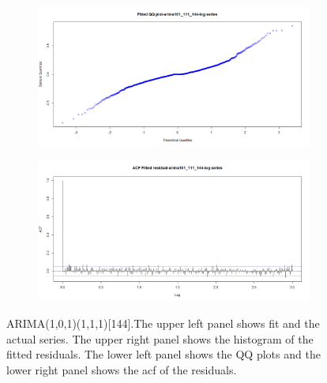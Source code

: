 \documentclass[12pt]{article}
\begin{document}
\begin{figure}[H]
\begin{subfigure}[b]{0.49\linewidth}
    \includegraphics[width=\linewidth]{figure15-3.png}
  \end{subfigure}
  \begin{subfigure}[b]{0.49\linewidth}
    \includegraphics[width=\linewidth]{figure15-4.png}
  \end{subfigure}
  \caption{ARIMA(1,0,1)(1,1,1)[144].The upper left panel shows fit and the actual series. The upper right panel shows the histogram of the fitted residuals. The lower left panel shows the QQ plots and the lower right panel shows the acf of the residuals.}
  \label{fig:figure15}
\end{figure}
\end{document}
